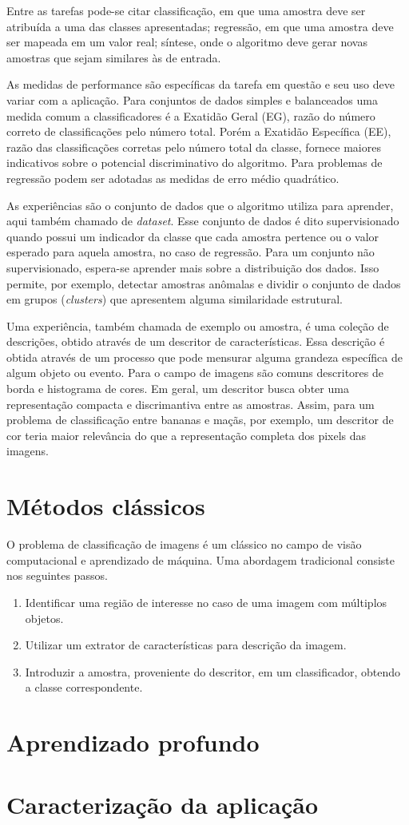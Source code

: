 Entre as tarefas pode-se citar classificação, em que uma amostra deve ser atribuída a uma das classes apresentadas; regressão, em que uma amostra deve ser mapeada em um valor real; síntese, onde o algoritmo deve gerar novas amostras que sejam similares às de entrada.

As medidas de performance são específicas da tarefa em questão e seu uso deve variar com a aplicação. Para conjuntos de dados simples e balanceados uma medida comum a classificadores é a Exatidão Geral (EG), razão do número correto de classificações pelo número total. Porém a Exatidão Específica (EE), razão das classificações corretas pelo número total da classe, fornece maiores indicativos sobre o potencial discriminativo do algoritmo. Para problemas de regressão podem ser adotadas as medidas de erro médio quadrático.

As experiências são o conjunto de dados que o algoritmo utiliza para aprender, aqui também chamado de \textit{dataset}. Esse conjunto de dados é dito supervisionado quando possui um indicador da classe que cada amostra pertence ou o valor esperado para aquela amostra, no caso de regressão. Para um conjunto não supervisionado, espera-se aprender mais sobre a distribuição dos dados. Isso permite, por exemplo, detectar amostras anômalas e dividir o conjunto de dados em grupos (\textit{clusters}) que apresentem alguma similaridade estrutural.

Uma experiência, também chamada de exemplo ou amostra, é uma coleção de descrições, obtido através de um descritor de características. Essa descrição é obtida através de um processo que pode mensurar alguma grandeza específica de algum objeto ou evento. Para o campo de imagens são comuns descritores de borda e histograma de cores. Em geral, um descritor busca obter uma representação compacta e discrimantiva entre as amostras. Assim, para um problema de classificação entre bananas e maçãs, por exemplo, um descritor de cor teria maior relevância do que a representação completa dos pixels das imagens. 


\section{Métodos clássicos}
O problema de classificação de imagens é um clássico no campo de visão computacional e aprendizado de máquina. Uma abordagem tradicional consiste nos seguintes passos.
	\begin{enumerate}
	\item Identificar uma região de interesse no caso de uma imagem com múltiplos objetos.
	\item Utilizar um extrator de características para descrição da imagem.
	\item Introduzir a amostra, proveniente do descritor, em um classificador, obtendo a classe correspondente.
	\end{enumerate}

\section{Aprendizado profundo}
\section{Caracterização da aplicação}

